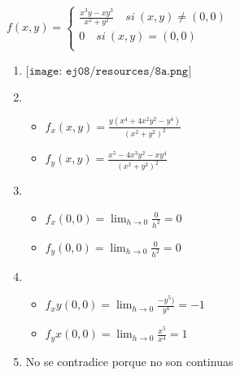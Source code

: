 \documentclass[../practica_04.tex]{subfiles}
\begin{document}
    $ f(x,y) = \left\{
    \begin{array}{ll}
        \frac{x^3y-xy^3}{x^2+y^2} \quad si\ (x,y)\neq(0,0)\\
        0 \quad si\ (x,y)=(0,0)\\
    \end{array}
    \right.$

    \begin{enumerate}
        \item 
            $ \texttt{[image: ej08/resources/8a.png]} $ 

        \item 
        
            \begin{itemize}
                \item $f_x(x,y) = \frac{y(x^4+4x^2y^2-y^4)}{(x^2+y^2)^2} $
                \item $f_y(x,y) = \frac{x^5-4x^3y^2-xy^4}{(x^2+y^2)^2}$
            \end{itemize}

        \item 

            \begin{itemize}
                \item $f_x(0,0) = \lim_{h\to0} \frac{0}{h^2} = 0 $
                \item $f_y(0,0) = \lim_{h\to0} \frac{0}{h^2} = 0 $
            \end{itemize}

        \item 

            \begin{itemize}
                \item $f_xy(0,0) = \lim_{h\to0} \frac{-y^5)}{y^4} = -1$
                \item $f_yx(0,0) = \lim_{h\to0} \frac{x^5}{x^4} = 1$
            \end{itemize}

        \item No se contradice porque no son continuas

    \end{enumerate}
\end{document}
